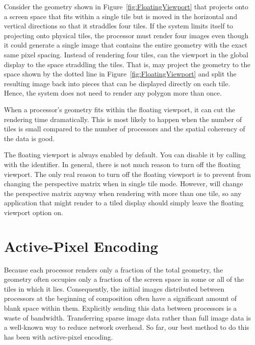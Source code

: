 Consider the geometry shown in Figure~\ref{fig:FloatingViewport} that
projects onto a screen space that fits within a single tile but is moved in
the horizontal and vertical directions so that it straddles four tiles.  If
the system limits itself to projecting onto physical tiles, the processor
must render four images even though it could generate a single
image that contains the entire geometry with the exact same pixel spacing.
Instead of rendering four tiles, \IceT can  the
viewport in the global display to the space straddling the tiles.  That is,
\IceT may project the geometry to the space shown by the dotted line
in Figure~\ref{fig:FloatingViewport} and split the resulting image back
into pieces that can be displayed directly on each tile.  Hence, the system
does not need to render any polygon more than once.

When a processor's geometry fits within the floating viewport, it can cut
the rendering time dramatically.  This is most likely to happen when the
number of tiles is small compared to the number of processors and the
spatial coherency of the data is good.

The floating viewport is always enabled by default.  You can disable it by
calling  with the 
identifier.  In general, there is not much reason to turn off the floating
viewport.  The only real reason to turn off the floating viewport is to
prevent \IceT from changing the perspective matrix when in single tile
mode.  However, \IceT will change the perspective matrix anyway when
rendering with more than one tile, so any application that might render to
a tiled display should simply leave the floating viewport option on.


\section{Active-Pixel Encoding}
\label{sec:Customizing_Compositing:Active_Pixel_Encoding}

Because each processor renders only a fraction of the total geometry, the
geometry often occupies only a fraction of the screen space in some or all
of the tiles in which it lies.  Consequently, the initial images
distributed between processors at the beginning of composition often have a
significant amount of blank space within them.  Explicitly sending this
data between processors is a waste of bandwidth.  Transferring
sparse image data rather than full image data is a well-known way to reduce
network overhead.  So far, our best method to do this has been with
active-pixel encoding.

